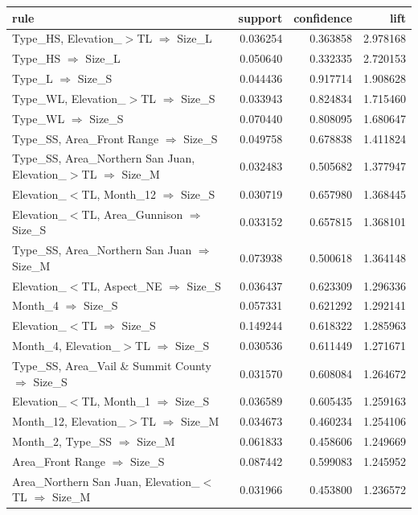 \begin{tabular}{lrrr}
\toprule
rule & support & confidence & lift \\
\midrule
Type\_HS, Elevation\_$>$TL $\Rightarrow$ Size\_L & 0.036254 & 0.363858 & 2.978168 \\
Type\_HS $\Rightarrow$ Size\_L & 0.050640 & 0.332335 & 2.720153 \\
Type\_L $\Rightarrow$ Size\_S & 0.044436 & 0.917714 & 1.908628 \\
Type\_WL, Elevation\_$>$TL $\Rightarrow$ Size\_S & 0.033943 & 0.824834 & 1.715460 \\
Type\_WL $\Rightarrow$ Size\_S & 0.070440 & 0.808095 & 1.680647 \\
Type\_SS, Area\_Front Range $\Rightarrow$ Size\_S & 0.049758 & 0.678838 & 1.411824 \\
Type\_SS, Area\_Northern San Juan, Elevation\_$>$TL $\Rightarrow$ Size\_M & 0.032483 & 0.505682 & 1.377947 \\
Elevation\_$<$TL, Month\_12 $\Rightarrow$ Size\_S & 0.030719 & 0.657980 & 1.368445 \\
Elevation\_$<$TL, Area\_Gunnison $\Rightarrow$ Size\_S & 0.033152 & 0.657815 & 1.368101 \\
Type\_SS, Area\_Northern San Juan $\Rightarrow$ Size\_M & 0.073938 & 0.500618 & 1.364148 \\
Elevation\_$<$TL, Aspect\_NE $\Rightarrow$ Size\_S & 0.036437 & 0.623309 & 1.296336 \\
Month\_4 $\Rightarrow$ Size\_S & 0.057331 & 0.621292 & 1.292141 \\
Elevation\_$<$TL $\Rightarrow$ Size\_S & 0.149244 & 0.618322 & 1.285963 \\
Month\_4, Elevation\_$>$TL $\Rightarrow$ Size\_S & 0.030536 & 0.611449 & 1.271671 \\
Type\_SS, Area\_Vail \& Summit County $\Rightarrow$ Size\_S & 0.031570 & 0.608084 & 1.264672 \\
Elevation\_$<$TL, Month\_1 $\Rightarrow$ Size\_S & 0.036589 & 0.605435 & 1.259163 \\
Month\_12, Elevation\_$>$TL $\Rightarrow$ Size\_M & 0.034673 & 0.460234 & 1.254106 \\
Month\_2, Type\_SS $\Rightarrow$ Size\_M & 0.061833 & 0.458606 & 1.249669 \\
Area\_Front Range $\Rightarrow$ Size\_S & 0.087442 & 0.599083 & 1.245952 \\
Area\_Northern San Juan, Elevation\_$<$TL $\Rightarrow$ Size\_M & 0.031966 & 0.453800 & 1.236572 \\

\end{tabular}
